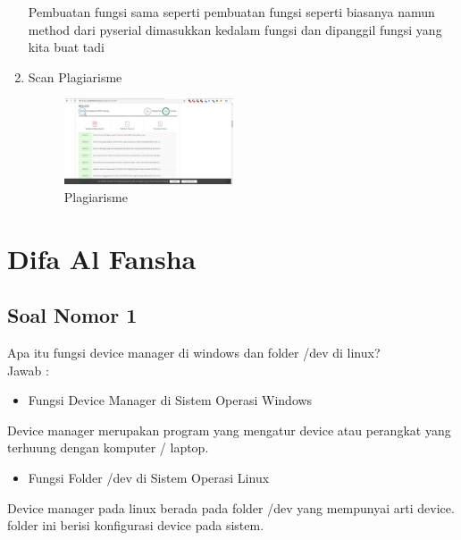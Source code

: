 \begin{enumerate}
Pembuatan fungsi sama seperti pembuatan fungsi seperti biasanya namun method dari pyserial dimasukkan kedalam fungsi dan dipanggil fungsi yang kita buat tadi


\item Scan Plagiarisme
\begin{figure}[ht!]
	\includegraphics[width=5cm]{figures/5/1174066/plagiat.jpg}
	\centering
	\caption{Plagiarisme}
\end{figure}
\end{enumerate}

\section{Difa Al Fansha}
\subsection{Soal Nomor 1}
Apa itu fungsi device manager di windows dan folder /dev di linux?\\
Jawab :
\begin{itemize}
\item Fungsi Device Manager di Sistem Operasi Windows
\end{itemize}
Device manager merupakan program yang mengatur device atau perangkat yang terhuung dengan komputer / laptop.
\begin{itemize}
\item Fungsi Folder /dev di Sistem Operasi Linux
\end{itemize}
Device manager pada linux berada pada folder /dev yang mempunyai arti device. folder ini berisi konfigurasi device pada sistem.

